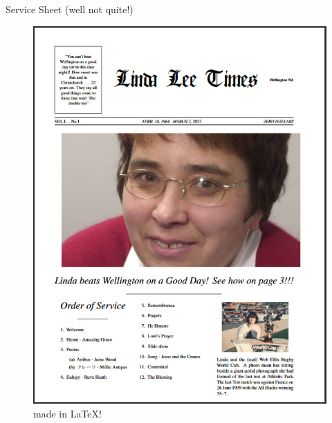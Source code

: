 \documentclass{beamer}
\begin{document}
\begin{frame}{Service Sheet (well not quite!)}

\begin{figure}
    \centering
    \includegraphics[height=0.7\textheight]{assets/Linda_Lee_Times.jpg}
    \caption{made in \LaTeX!}
    \label{fig:qr-code}
\end{figure}
\end{frame}
\end{document}
